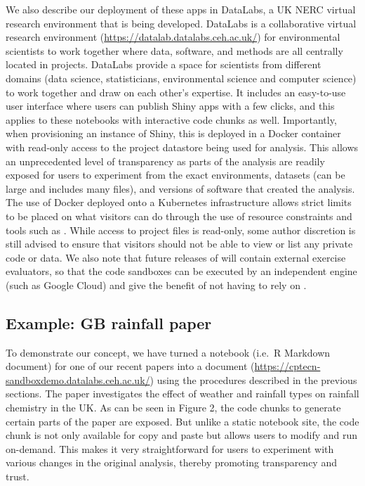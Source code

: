 We also describe our deployment of these apps in DataLabs, a UK NERC
virtual research environment that is being developed. DataLabs is a
collaborative virtual research environment \citep{Hollaway2020}
(\url{https://datalab.datalabs.ceh.ac.uk/}) for environmental scientists
to work together where data, software, and methods are all centrally
located in projects. DataLabs provide a space for scientists from
different domains (data science, statisticians, environmental science
and computer science) to work together and draw on each other's
expertise. It includes an easy-to-use user interface where users can
publish Shiny apps with a few clicks, and this applies to these
notebooks with interactive code chunks as well. Importantly, when
provisioning an instance of Shiny, this is deployed in a Docker
container with read-only access to the project datastore being used for
analysis. This allows an unprecedented level of transparency as parts of
the analysis are readily exposed for users to experiment from the exact
environments, datasets (can be large and includes many files), and
versions of software that created the analysis. The use of Docker
deployed onto a Kubernetes infrastructure allows strict limits to be
placed on what visitors can do through the use of resource constraints
and tools such as  \citep{RAppArmor}. While access to
project files is read-only, some author discretion is still advised to
ensure that visitors should not be able to view or list any private code
or data. We also note that future releases of  will
contain external exercise evaluators, so that the code sandboxes can be
executed by an independent engine (such as Google Cloud) and give the
benefit of not having to rely on .

\hypertarget{example-gb-rainfall-paper}{%
\subsection{Example: GB rainfall
paper}\label{example-gb-rainfall-paper}}

To demonstrate our concept, we have turned a notebook (i.e.~R Markdown
document) for one of our recent papers \citep{Tso2022} into a
 document
(\url{https://cptecn-sandboxdemo.datalabs.ceh.ac.uk/}) using the
procedures described in the previous sections. The paper investigates
the effect of weather and rainfall types on rainfall chemistry in the
UK. As can be seen in Figure 2, the code chunks to generate certain
parts of the paper are exposed. But unlike a static notebook site, the
code chunk is not only available for copy and paste but allows users to
modify and run on-demand. This makes it very straightforward for users
to experiment with various changes in the original analysis, thereby
promoting transparency and trust.

